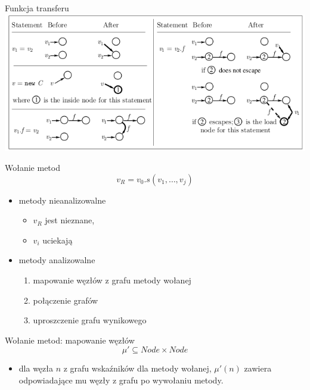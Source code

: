 \documentclass{beamer}
\begin{document}
\begin{frame}{Funkcja transferu}
  \includegraphics[width=\columnwidth]{img/transfer.png}
\end{frame}

\begin{frame}{Wołanie metod}
  $$v_R = v_0.s(v_1, \dots, v_j)$$
  \begin{itemize}
    \item<1-> metody nieanalizowalne
      \begin{itemize}
        \item $v_R$ jest nieznane, 
        \item $v_i$ uciekają
      \end{itemize}
    \item<2-> metody analizowalne
      \begin{enumerate}
        \item mapowanie węzłów z grafu metody wołanej
        \item połączenie grafów
        \item uproszczenie grafu wynikowego
      \end{enumerate}
  \end{itemize}
\end{frame}

\begin{frame}{Wołanie metod: mapowanie węzłów}
  $$\mu' \subseteq Node \times Node$$
  \begin{itemize}
  \item dla węzła $n$ z grafu wskaźników dla metody wołanej, $\mu'(n)$
    zawiera odpowiadające mu węzły z grafu po wywołaniu metody.
  \end{itemize}
\end{frame}
\end{document}
